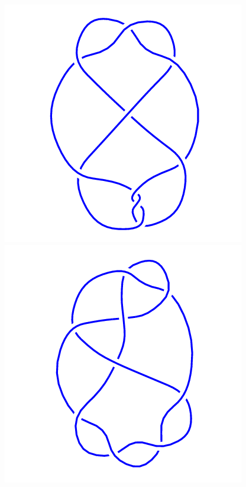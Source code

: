 \begin{figure}[H]
\begin{minipage}[b]{.18\linewidth}
    \end{minipage}
    \begin{minipage}[b]{.18\linewidth}
        \centering
        \includegraphics[width=\linewidth]{../data/9_13.png}
    \end{minipage}
    \begin{minipage}[b]{.18\linewidth}
        \centering
        \includegraphics[width=\linewidth]{../data/9_14.png}

\end{minipage}
\end{figure}

